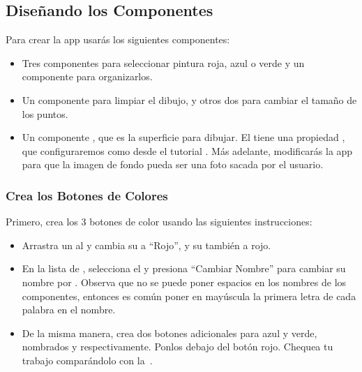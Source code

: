 \subsection*{Diseñando los Componentes}

Para crear la app usarás los siguientes componentes:

\begin{itemize}

\item Tres componentes  para seleccionar pintura
  roja, azul o verde y un componente 
  para organizarlos.

\item Un componente  para limpiar el dibujo, y otros
  dos para cambiar el tamaño de los puntos.

\item Un componente , que es la superficie para
  dibujar. El  tiene una propiedad
  , que configuraremos como
   desde el tutorial . Más
  adelante, modificarás la app para que la imagen de fondo pueda ser
  una foto sacada por el usuario.

\end{itemize}

\subsubsection*{Crea los Botones de Colores}

Primero, crea los 3 botones de color usando las siguientes
instrucciones:

\begin{itemize}
\item Arrastra un  al \viewer y cambia su
   a ``Rojo'', y su  también a
  rojo.

\item En la lista de \componentList, selecciona el 
  y presiona ``Cambiar Nombre'' para cambiar su nombre por
  . Observa que no se puede poner espacios en los
  nombres de los componentes, entonces es común poner en mayúscula la
  primera letra de cada palabra en el nombre.

\item De la misma manera, crea dos botones adicionales para azul y
  verde, nombrados  y 
  respectivamente. Ponlos debajo del botón rojo. Chequea tu trabajo
  comparándolo con la~.

\end{itemize}

